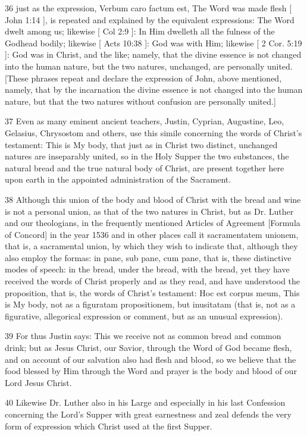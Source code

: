 36 just as the expression, Verbum caro factum est, The Word was made flesh [ John 1:14 ], is repeated and explained by the equivalent expressions: The Word dwelt among us; likewise [ Col 2:9 ]: In Him dwelleth all the fulness of the Godhead bodily; likewise [ Acts 10:38 ]: God was with Him; likewise [ 2 Cor. 5:19 ]: God was in Christ, and the like; namely, that the divine essence is not changed into the human nature, but the two natures, unchanged, are personally united. [These phrases repeat and declare the expression of John, above mentioned, namely, that by the incarnation the divine essence is not changed into the human nature, but that the two natures without confusion are personally united.]

37 Even as many eminent ancient teachers, Justin, Cyprian, Augustine, Leo, Gelasius, Chrysostom and others, use this simile concerning the words of Christ’s testament: This is My body, that just as in Christ two distinct, unchanged natures are inseparably united, so in the Holy Supper the two substances, the natural bread and the true natural body of Christ, are present together here upon earth in the appointed administration of the Sacrament.

38 Although this union of the body and blood of Christ with the bread and wine is not a personal union, as that of the two natures in Christ, but as Dr. Luther and our theologians, in the frequently mentioned Articles of Agreement [Formula of Concord] in the year 1536 and in other places call it sacramentatem unionem, that is, a sacramental union, by which they wish to indicate that, although they also employ the formas: in pane, sub pane, cum pane, that is, these distinctive modes of speech: in the bread, under the bread, with the bread, yet they have received the words of Christ properly and as they read, and have understood the proposition, that is, the words of Christ’s testament: Hoc est corpus meum, This is My body, not as a figuratam propositionem, but inusitatam (that is, not as a figurative, allegorical expression or comment, but as an unusual expression).

39 For thus Justin says: This we receive not as common bread and common drink; but as Jesus Christ, our Savior, through the Word of God became flesh, and on account of our salvation also had flesh and blood, so we believe that the food blessed by Him through the Word and prayer is the body and blood of our Lord Jesus Christ.

40 Likewise Dr. Luther also in his Large and especially in his last Confession concerning the Lord’s Supper with great earnestness and zeal defends the very form of expression which Christ used at the first Supper.


